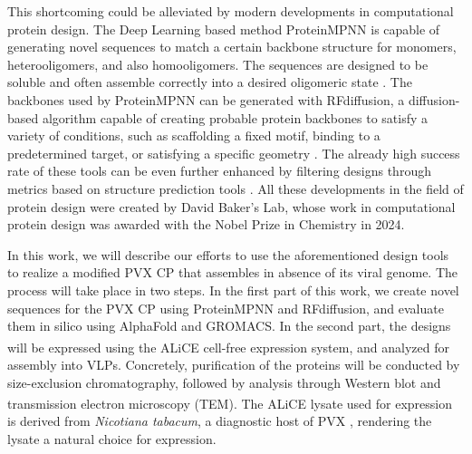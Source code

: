 
This shortcoming could be alleviated by modern developments in computational protein design. The Deep Learning based method ProteinMPNN is capable of generating novel sequences to match a certain backbone structure for monomers, heterooligomers, and also homooligomers. The sequences are designed to be soluble and often assemble correctly into a desired oligomeric state \cite{PMPNN2022}. The backbones used by ProteinMPNN can be generated with RFdiffusion, a diffusion-based algorithm capable of creating probable protein backbones to satisfy a variety of conditions, such as scaffolding a fixed motif, binding to a predetermined target, or satisfying a specific geometry \cite{RFdiffusion}. The already high success rate of these tools can be even further enhanced by filtering designs through metrics based on structure prediction tools \cite{physics_binder_design}. All these developments in the field of protein design were created by David Baker's Lab, whose work in computational protein design was awarded with the Nobel Prize in Chemistry in 2024. 

In this work, we will describe our efforts to use the aforementioned design tools to realize a modified PVX CP that assembles in absence of its viral genome. The process will take place in two steps. In the first part of this work, we create novel sequences for the PVX CP using ProteinMPNN and RFdiffusion, and evaluate them in silico using AlphaFold and GROMACS. In the second part, the designs will be expressed using the ALiCE\textsuperscript{\textregistered} cell-free expression system, and analyzed for assembly into VLPs. Concretely, purification of the proteins will be conducted by size-exclusion chromatography, followed by analysis through Western blot and transmission electron microscopy (TEM). 
The ALiCE\textsuperscript{\textregistered} lysate used for expression is derived from \emph{Nicotiana tabacum}, a diagnostic host of PVX \cite{pvx_host_tabacum}, rendering the lysate a natural choice for expression. 